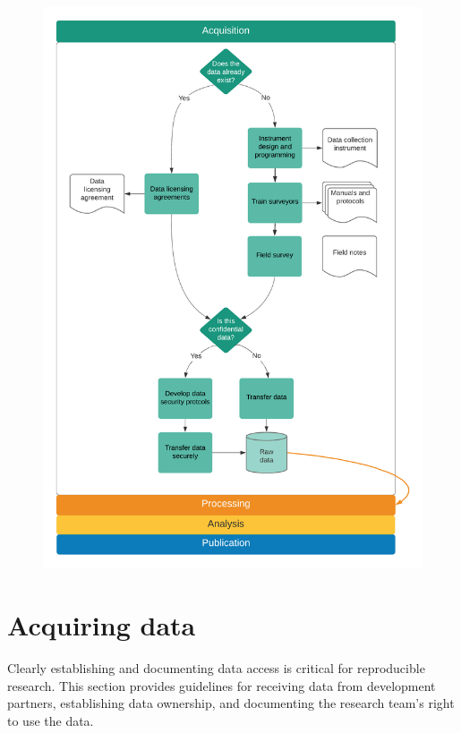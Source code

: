 \begin{fullwidth}
	\begin{figure}
		\centering
		\includegraphics[width=1.5\linewidth]{diagrams/Acquisition}
		\caption{}
		\label{fig:intro}
	\end{figure}
\end{fullwidth}

\section{Acquiring data}
Clearly establishing and documenting data access is critical for reproducible research.
This section provides guidelines for receiving data from development partners,
establishing data ownership,
and documenting the research team's right to use the data.

